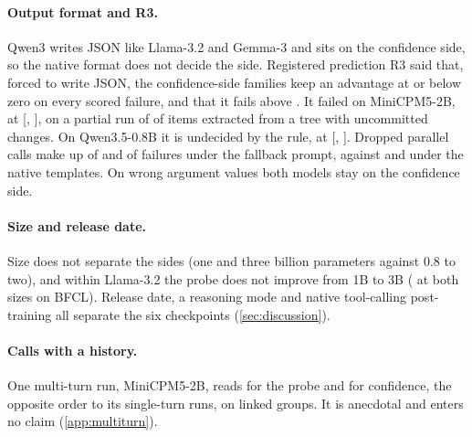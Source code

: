 \paragraph{Output format and R3.}
Qwen3 writes JSON like Llama-3.2 and Gemma-3 and sits on the confidence side, so the native format does not decide the side. Registered prediction R3 said that, forced to write JSON, the confidence-side families keep an advantage at or below zero on every scored failure, and that it fails above \rThreeThreshold{}. It failed on MiniCPM5-2B, at \rThreeJsonMiniCpm{} [\rThreeJsonLoMiniCpm{}, \rThreeJsonHiMiniCpm{}], on a partial run of \nJsonItemsMiniCpm{} of \nAllMiniCpmBfcl{} items extracted from a tree with uncommitted changes. On Qwen3.5-0.8B it is undecided by the rule, at \rThreeJsonQwenThreeFive{} [\rThreeJsonLoQwenThreeFive{}, \rThreeJsonHiQwenThreeFive{}]. Dropped parallel calls make up \rThreeMcJsonMiniCpm{} of \rThreePosJsonMiniCpm{} and \rThreeMcJsonQwenThreeFive{} of \rThreePosJsonQwenThreeFive{} failures under the fallback prompt, against \rThreeMcNatMiniCpm{} and \rThreeMcNatQwenThreeFive{} under the native templates. On wrong argument values both models stay on the confidence side.

\paragraph{Size and release date.}
Size does not separate the sides (one and three billion parameters against 0.8 to two), and within Llama-3.2 the probe does not improve from 1B to 3B (\aucProbeLlamaOneBBfcl{} at both sizes on BFCL). Release date, a reasoning mode and native tool-calling post-training all separate the six checkpoints (\cref{sec:discussion}).

\paragraph{Calls with a history.}
One multi-turn run, MiniCPM5-2B, reads \mtAucProbe{} for the probe and \mtAucConf{} for confidence, the opposite order to its single-turn runs, on \mtGroupsAll{} linked groups. It is anecdotal and enters no claim (\cref{app:multiturn}).
